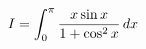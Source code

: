 \documentclass[preview]{standalone}
\begin{document}
\begin{align*}
\special{dvisvgm:raw <g id='unique000'>}\displaystyle I=\int_0^\pi\frac{x\sin x}{1+\cos^2 x}\,dx\special{dvisvgm:raw </g>}
\end{align*}
\end{document}
